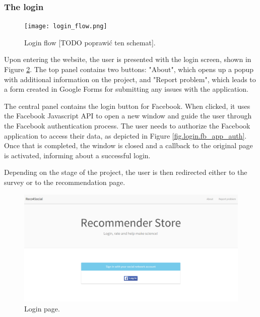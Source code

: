\documentclass[12pt]{report}
\begin{document}
\subsubsection{The login}

\begin{figure}[!h]
\centering
\texttt{[image: login\_flow.png]} 
\caption[Login flow.]{Login flow [TODO poprawić ten schemat].}
\label{fig.login_flow}
\end{figure}

Upon entering the website, the user is presented with the login screen, shown in Figure \ref{fig.login}. The top panel contains two buttons: "About", which opens up a popup with additional information on the project, and "Report problem", which leads to a form created in Google Forms for submitting any issues with the application.

The central panel contains the login button for Facebook. When clicked, it uses the Facebook Javascript API to open a new window and guide the user through the Facebook authentication process. The user needs to authorize the Facebook application to access their data, as depicted in Figure \ref{fig.login.fb_app_auth}. Once that is completed, the window is closed and a callback to the original page is activated, informing about a successful login.

Depending on the stage of the project, the user is then redirected either to the survey or to the recommendation page. 

\begin{figure}[!t]
\centering
\includegraphics[width=\textwidth]{reco4_login.png} 
\caption[Login page.]{Login page.}
\label{fig.login}
\end{figure}
\end{document}
